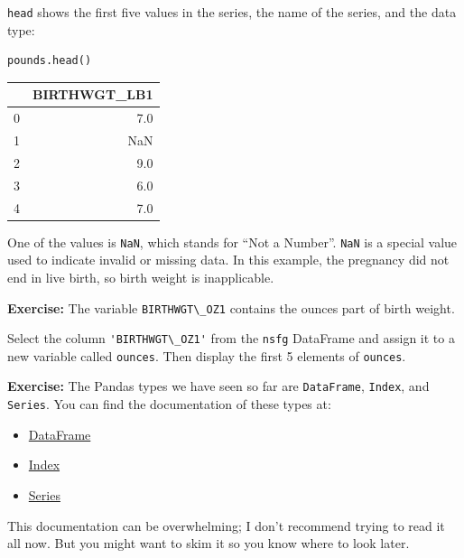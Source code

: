 \passthrough{\lstinline!head!} shows the first five values in the
series, the name of the series, and the data type:

\begin{lstlisting}[language=Python,style=source]
pounds.head()
\end{lstlisting}

\begin{tabular}{lr}
\toprule
{} &  BIRTHWGT\_LB1 \\
\midrule
0 &           7.0 \\
1 &           NaN \\
2 &           9.0 \\
3 &           6.0 \\
4 &           7.0 \\
\bottomrule
\end{tabular}

One of the values is \passthrough{\lstinline!NaN!}, which stands for
``Not a Number''. \passthrough{\lstinline!NaN!} is a special value used
to indicate invalid or missing data. In this example, the pregnancy did
not end in live birth, so birth weight is inapplicable.

\textbf{Exercise:} The variable \passthrough{\lstinline!BIRTHWGT\_OZ1!}
contains the ounces part of birth weight.

Select the column \passthrough{\lstinline!'BIRTHWGT\_OZ1'!} from the
\passthrough{\lstinline!nsfg!} DataFrame and assign it to a new variable
called \passthrough{\lstinline!ounces!}. Then display the first 5
elements of \passthrough{\lstinline!ounces!}.

\textbf{Exercise:} The Pandas types we have seen so far are
\passthrough{\lstinline!DataFrame!}, \passthrough{\lstinline!Index!},
and \passthrough{\lstinline!Series!}. You can find the documentation of
these types at:

\begin{itemize}
\item
  \href{https://pandas.pydata.org/pandas-docs/stable/reference/api/pandas.DataFrame.html}{DataFrame}
\item
  \href{https://pandas.pydata.org/pandas-docs/stable/reference/api/pandas.Index.html}{Index}
\item
  \href{https://pandas.pydata.org/pandas-docs/stable/reference/api/pandas.Series.html}{Series}
\end{itemize}

This documentation can be overwhelming; I don't recommend trying to read
it all now. But you might want to skim it so you know where to look
later.

